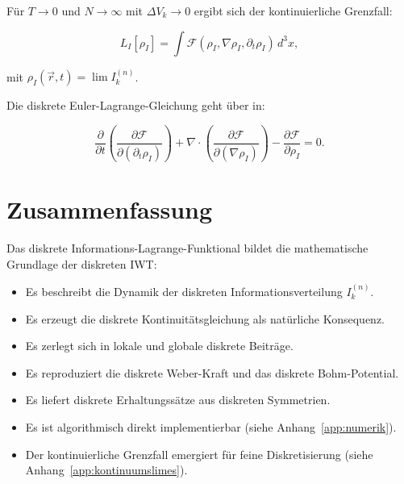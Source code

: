 Für \( T \to 0 \) und \( N \to \infty \) mit \( \Delta V_k \to 0 \) ergibt sich der kontinuierliche Grenzfall:

\[
L_I[\rho_I] = \int \mathcal{F}(\rho_I, \nabla \rho_I, \partial_t \rho_I) \, d^3x,
\]

mit \( \rho_I(\vec{r}, t) = \lim I_k^{(n)} \).

Die diskrete Euler-Lagrange-Gleichung geht über in:

\[
\frac{\partial}{\partial t} \left( \frac{\partial \mathcal{F}}{\partial (\partial_t \rho_I)} \right) + \nabla \cdot \left( \frac{\partial \mathcal{F}}{\partial (\nabla \rho_I)} \right) - \frac{\partial \mathcal{F}}{\partial \rho_I} = 0.
\]

\section{Zusammenfassung}
\label{sec:lagrange_zusammenfassung}

Das diskrete Informations-Lagrange-Funktional bildet die mathematische Grundlage der diskreten IWT:

\begin{itemize}
    \item Es beschreibt die Dynamik der diskreten Informationsverteilung \( I_k^{(n)} \).
    \item Es erzeugt die diskrete Kontinuitätsgleichung als natürliche Konsequenz.
    \item Es zerlegt sich in lokale und globale diskrete Beiträge.
    \item Es reproduziert die diskrete Weber-Kraft und das diskrete Bohm-Potential.
    \item Es liefert diskrete Erhaltungssätze aus diskreten Symmetrien.
    \item Es ist algorithmisch direkt implementierbar (siehe Anhang~\ref{app:numerik}).
    \item Der kontinuierliche Grenzfall emergiert für feine Diskretisierung (siehe Anhang~\ref{app:kontinuumslimes}).
\end{itemize}